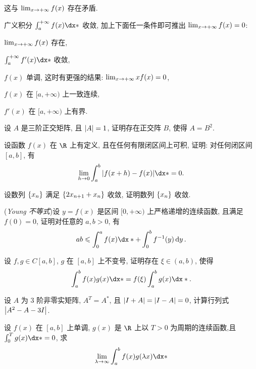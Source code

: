 \begin{exercise}[series=exer]
\begin{answer}
\begin{answersheet}
          这与 $ \lim_{x \to +\infty}f(x) $ 存在矛盾.
      \end{answersheet}
  \end{answer}
  \item 广义积分 $ \int_{a}^{+\infty} f(x) \dx* $ 收敛, 加上下面任一条件即可推出 $ \lim_{x \to +\infty} f(x) = 0 $:
  \begin{exercise}
      \item $ \lim_{x \to +\infty} f(x) $ 存在,
      \item $ \int_{a}^{+\infty} f'(x) \dx* $ 收敛,
      \item $ f(x) $ 单调, 这时有更强的结果: $ \lim_{x \to +\infty} xf(x) = 0 $,
      \item $ f(x) $ 在 $ [a, +\infty) $ 上一致连续,
      \item $ f'(x) $ 在 $ [a, +\infty) $ 上有界.
  \end{exercise}
  \item 设 $ A $ 是三阶正交矩阵, 且 $ \abs{A} = 1 $, 证明存在正交阵 $ B $, 使得 $ A = B^{2} $.
  \item 设函数 $ f(x) $ 在 $ \R $ 上有定义, 且在任何有限闭区间上可积, 证明: 对任何闭区间 $ [a, b] $, 有
  \begin{align*}
      \limit{h}{0} \int_{a}^{b} \abs{f(x + h) - f(x)} \dx* = 0.
  \end{align*}
  \item 设数列 $ \qty{x_{n}} $ 满足 $ \qty{2x_{n+1} + x_{n}} $ 收敛, 证明数列 $ \qty{x_{n}} $ 收敛.
  \item (\emph{Young 不等式})设 $ y=f(x) $ 是区间 $ [0, +\infty) $ 上严格递增的连续函数, 且满足 $ f(0) = 0 $, 证明对任意的 $ a, b > 0 $, 有
  \begin{align*}
      ab \le \int_{0}^{a}f(x) \dx* + \int_{0}^{b} f^{-1}(y) \dd{y}.
  \end{align*}
  \item 设 $ f, g \in C[a, b] $, $ g $ 在 $ [a, b] $ 上不变号, 证明存在 $ \xi\in (a, b) $, 使得
  \begin{align*}
      \int_{a}^{b} f(x)g(x) \dx* = f(\xi)\int_{a}^{b} g(x) \dx*.
  \end{align*}
  \item 设 $ A $ 为 $ 3 $ 阶非零实矩阵, $ A^{T} = A^{*} $, 且 $ \abs{I + A} = \abs{I - A} = 0 $, 计算行列式 $ \abs{A^{2} - A - 3I} $.
  \item 设 $ f(x) $ 在 $ [a, b] $ 上单调, $ g(x) $ 是 $ \R $ 上以 $ T>0 $ 为周期的连续函数,且 $ \int_{0}^{T} g(x) \dx* = 0 $, 求
  \begin{align*}
      \limit{\lambda}{\infty} \int_{a}^{b} f(x)g(\lambda x) \dx*

\end{align*}
\end{exercise}

